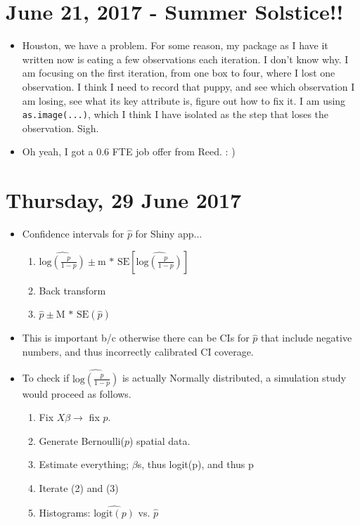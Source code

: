 \documentclass{article}
\begin{document}
\section{June 21, 2017 - Summer Solstice!!}
\begin{itemize}
\item Houston, we have a problem. For some reason, my package as I have it written now is eating a few observations each iteration. I don't know why. I am focusing on the first iteration, from one box to four, where I lost one observation. I think I need to record that puppy, and see which observation I am losing, see what its key attribute is, figure out how to fix it. I am using \verb|as.image(...)|, which I think I have isolated as the step that loses the observation. Sigh.
\item Oh yeah, I got a 0.6 FTE job offer from Reed. : )
\end{itemize}

\section{Thursday, 29 June 2017}
\begin{itemize}
\item Confidence intervals for $\hat{p}$ for Shiny app...
  \begin{enumerate}
  \item $\widehat{ \text{log} \left(\frac{p}{1-p} \right) }  
  \pm \text{m * SE}
  \left[ \widehat{ \text{log}\left(\frac{p}{1-p}\right)} \right]$
  \item Back transform
  \item $\hat{p} \pm \text{M * SE}(\hat{p})$
  \end{enumerate}
\item This is important b/c otherwise there can be CIs for $\hat{p}$ that include negative numbers, and thus incorrectly calibrated CI coverage.
\item To check if $\widehat{ \text{log}\left(\frac{p}{1-p}\right)}$ is actually Normally distributed, a simulation study would proceed as follows.
  \begin{enumerate}
  \item Fix $X\beta \rightarrow$ fix $p$.
  \item Generate Bernoulli($p$) spatial data.
  \item Estimate everything; $\beta$s, thus logit(p), and thus p
  \item Iterate (2) and (3)
  \item Histograms: $\widehat{\text{logit}(p)}$ vs. $\hat{p}$
  \end{enumerate}
\end{itemize}
\end{document}
